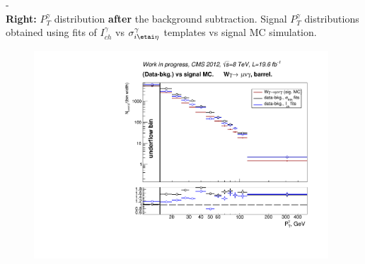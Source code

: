 \begin{frame}
\begin{minipage}[b]{0.49\textwidth}
-\\
{\bfseries{Right:}} $P_T^{\gamma}$ distribution {\bfseries{after}} the background subtraction. Signal $P_T^{\gamma}$ distributions obtained using fits of $I_{ch}^{\gamma}$ vs $\sigma_{i\etai\eta}^{\gamma}$ templates vs signal MC simulation.\\
  \begin{figure}[htb]
    \begin{center}
       \includegraphics[width=0.98\textwidth]{../figs/figs_v11/MUON_WGamma/PrepareYields/c_BkgSubtrDATAvsSIGMC_c_MUON_WGamma__UNblind__Barrel__phoEt.pdf}\\
    \end{center}
  \end{figure}
\end{minipage}
\end{frame}%


